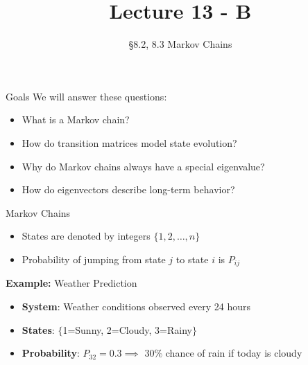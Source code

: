 \documentclass[10pt]{beamer}
\title[Math/CS 375]{Lecture 13 - B}
\subtitle{\S 8.2, 8.3 Markov Chains}
\begin{document}
\begin{frame}
  \titlepage
\end{frame}

\begin{frame}{Goals}
We will answer these questions:\\[3mm]
\begin{itemize}
    \item What is a Markov chain?
    \item How do transition matrices model state evolution?
    \item Why do Markov chains always have a special eigenvalue?
    \item How do eigenvectors describe long-term behavior?
\end{itemize}
\end{frame}



\begin{frame}{Markov Chains}

\begin{itemize}
    \item States are denoted by integers $\{1,2,\ldots,n\}$
    \item Probability of jumping from state $j$ to state $i$ is $P_{ij}$
\end{itemize}

\vspace{5mm}
\textbf{Example:} Weather Prediction
\begin{itemize}
    \item \textbf{System}: Weather conditions observed every 24 hours
    \item \textbf{States}: $\{$1=Sunny, 2=Cloudy, 3=Rainy$\}$
    \item \textbf{Probability}: $P_{32}=0.3 \implies$  $30\%$ chance of rain if today is cloudy
\end{itemize}
\end{frame}
\end{document}
